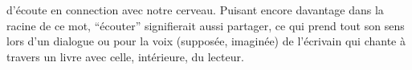 d'écoute en connection avec notre cerveau.
Puisant encore davantage dans  la racine de ce mot, ``écouter'' signifierait
aussi partager, ce qui prend tout son sens lors d'un dialogue ou
pour la voix (supposée, imaginée) de  l'écrivain qui
 chante à travers un livre avec celle, intérieure, du lecteur.
 
